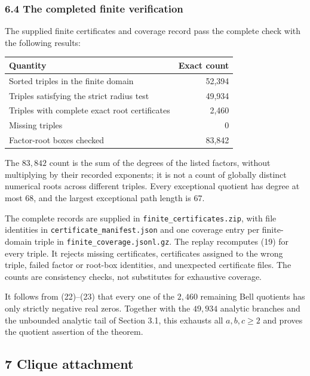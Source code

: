 \documentclass[
  11pt,
  a4paper,
]{article}
\begin{document}
\subsubsection{6.4 The completed finite
verification}\label{the-completed-finite-verification}

The supplied finite certificates and coverage record pass the complete
check with the following results:

\begin{longtable}[]{@{}lr@{}}
\toprule\noalign{}
Quantity & Exact count \\
\midrule\noalign{}
\endhead
\bottomrule\noalign{}
\endlastfoot
Sorted triples in the finite domain & 52,394 \\
Triples satisfying the strict radius test & 49,934 \\
Triples with complete exact root certificates & 2,460 \\
Missing triples & 0 \\
Factor-root boxes checked & 83,842 \\
\end{longtable}

The \(83,842\) count is the sum of the degrees of the listed factors,
without multiplying by their recorded exponents; it is not a count of
globally distinct numerical roots across different triples. Every
exceptional quotient has degree at most \(68\), and the largest
exceptional path length is \(67\).

\begin{samepage}
The complete records are supplied in
\texttt{\nolinkurl{finite_certificates.zip}}, with file identities in
\texttt{\nolinkurl{certificate_manifest.json}} and one coverage entry
per finite-domain triple in
\texttt{\nolinkurl{finite_coverage.jsonl.gz}}. The replay recomputes
(19) for every triple. It rejects missing certificates, certificates
assigned to the wrong triple, failed factor or root-box identities, and
unexpected certificate files. The counts are consistency checks, not
substitutes for exhaustive coverage.

\end{samepage}

It follows from (22)--(23) that every one of the \(2,460\) remaining
Bell quotients has only strictly negative real zeros. Together with the
\(49,934\) analytic branches and the unbounded analytic tail of Section
3.1, this exhausts all \(a,b,c\geq2\) and proves the quotient assertion
of the theorem.

\subsection{7 Clique attachment}\label{clique-attachment}
\end{document}

